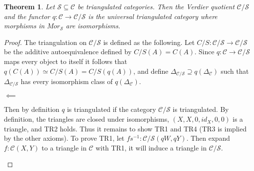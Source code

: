 \documentclass[12pt]{article}
\newtheorem{theorem}{Theorem}[section]
\theoremstyle{definition}
\theoremstyle{remark}
\begin{document}
            \begin{theorem}
                Let $\mathcal{S}\subseteq\mathcal{C}$ be triangulated categories. Then the Verdier quotient $\mathcal{C}/\mathcal{S}$ and the functor $q:\mathcal{C}\rightarrow\mathcal{C}/\mathcal{S}$ is the universal triangulated category where morphisms in $Mor_\mathcal{S}$ are isomorphisms.
            \end{theorem}

            \begin{proof}
                The triangulation on $\mathcal{C}/\mathcal{S}$ is defined as the following. Let $C/S:\mathcal{C}/\mathcal{S}\rightarrow\mathcal{C}/\mathcal{S}$ be the additive autoequivalence defined by $C/S(A)=C(A)$. Since $q:\mathcal{C}\rightarrow\mathcal{C}/\mathcal{S}$ maps every object to itself it follows that $q(C(A)) \simeq C/S(A) = C/S(q(A))$, and define $\Delta_{\mathcal{C}/\mathcal{S}}\supseteq q(\Delta_\mathcal{C})$ such that $\Delta_{\mathcal{C}/\mathcal{S}}$ has every isomorphism class of $q(\Delta_\mathcal{C})$. 
                \begin{center}
                    $\impliedby$
                \end{center}
                Then by definition $q$ is triangulated if the category $\mathcal{C}/\mathcal{S}$ is triangulated.
                By definition, the triangles are closed under isomorphisms, $(X,X,0,id_X,0,0)$ is a triangle, and TR2 holds. Thus it remains to show TR1 and TR4 (TR3 is implied by the other axioms). To prove TR1, let $fs^{-1}:\mathcal{C}/\mathcal{S}(qW,qY)$. Then expand $f:\mathcal{C}(X,Y)$ to a triangle in $\mathcal{C}$ with TR1, it will induce a triangle in  $\mathcal{C}/\mathcal{S}$.
                \begin{center}

\end{center}
\end{proof}
\end{document}
